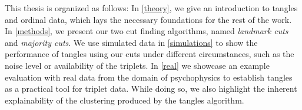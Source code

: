 This thesis is organized as follows: In \autoref{theory}, we give an introduction to tangles and ordinal data, which lays the necessary foundations for the rest of the work. 
In \autoref{methods}, we present our two cut finding algorithms, named \textit{landmark cuts} and \textit{majority cuts}.
We use simulated data in \autoref{simulations} to show the performance of tangles using our cuts under different circumstances, such as the noise level or availability of the triplets. 
In \autoref{real} we showcase an example evaluation with real data from the domain of psychophysics to establish tangles as a practical tool for triplet data.
While doing so, we also highlight the inherent explainability of the clustering produced by 
the tangles algorithm. 
